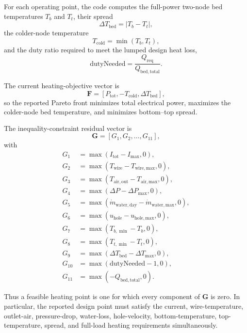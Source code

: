 \documentclass{article}
\begin{document}
For each operating point, the code computes the full-power two-node bed
temperatures $T_b$ and $T_t$, their spread
\begin{equation}
\Delta T_{\mathrm{bed}} = |T_b - T_t|,
\end{equation}
the colder-node temperature
\begin{equation}
T_{\mathrm{cold}} = \min(T_b,T_t),
\end{equation}
and the duty ratio required to meet the lumped design heat loss,
\begin{equation}
\mathrm{dutyNeeded}
= \frac{Q_{\mathrm{req}}}{Q_{\mathrm{bed,total}}}.
\end{equation}

The current heating-objective vector is
\begin{equation}
\mathbf{F}
=
\left[
P_{\mathrm{tot}},
-T_{\mathrm{cold}},
\Delta T_{\mathrm{bed}}
\right],
\end{equation}
so the reported Pareto front minimizes total electrical power, maximizes the
colder-node bed temperature, and minimizes bottom--top spread.

The inequality-constraint residual vector is
\begin{equation}
\mathbf{G}
=
\left[
G_1,G_2,\dots,G_{11}
\right],
\end{equation}
with
\begin{align}
G_1 &= \max(I_{\mathrm{tot}} - I_{\max}, 0), \\
G_2 &= \max(T_{\mathrm{wire}} - T_{\mathrm{wire,max}}, 0), \\
G_3 &= \max(T_{\mathrm{air,out}} - T_{\mathrm{air,max}}, 0), \\
G_4 &= \max(\Delta P - \Delta P_{\max}, 0), \\
G_5 &= \max(\dot{m}_{\mathrm{water,day}} - \dot{m}_{\mathrm{water,max}}, 0), \\
G_6 &= \max(u_{\mathrm{hole}} - u_{\mathrm{hole,max}}, 0), \\
G_7 &= \max(T_{b,\min} - T_b, 0), \\
G_8 &= \max(T_{t,\min} - T_t, 0), \\
G_9 &= \max(\Delta T_{\mathrm{bed}} - \Delta T_{\max}, 0), \\
G_{10} &= \max(\mathrm{dutyNeeded} - 1, 0), \\
G_{11} &= \max(-Q_{\mathrm{bed,total}}, 0).
\end{align}

Thus a feasible heating point is one for which every component of
$\mathbf{G}$ is zero. In particular, the reported design point must satisfy
the current, wire-temperature, outlet-air, pressure-drop, water-loss,
hole-velocity, bottom-temperature, top-temperature, spread, and full-load
heating requirements simultaneously.
\end{document}
